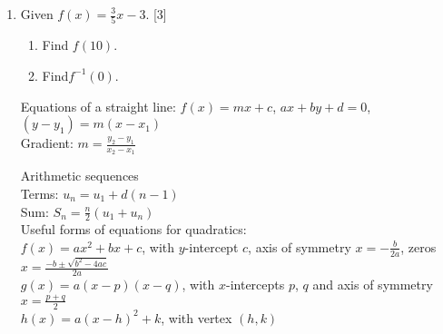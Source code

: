 \documentclass[12pt, twoside]{article}
\begin{document}
\begin{enumerate}
\item Given $f(x)=\frac{3}{5}x-3$.  \hfill [3]
\begin{enumerate}
    \item Find $f(10)$. \vspace{2cm}
    \item Find$f^{-1}(0)$.
\end{enumerate}

\newpage
Equations of a straight line: $f(x)=mx+c$, $ax+by+d=0$, $(y-y_1)=m(x-x_1)$\\[0.25cm]
Gradient: $\displaystyle m=\frac{y_2-y_1}{x_2-x_1}$ \vspace{1cm}

Arithmetic sequences\\[0.25cm]
Terms: $u_n=u_1 + d(n-1)$\\[0.25cm]
Sum: $\displaystyle S_n= \frac{n}{2}(u_1 + u_n)$\\[0.25cm]

Useful forms of equations for quadratics:\\[0.25cm] 
$f(x)=ax^2 + bx+c$, with $y$-intercept $c$, axis of symmetry $\displaystyle x=-\frac{b}{2a}$, zeros $\displaystyle x=\frac{-b \pm \sqrt{b^2-4ac}}{2a}$\\[0.25cm]
$g(x)=a(x-p)(x-q)$, with $x$-intercepts $p$, $q$ and axis of symmetry $\displaystyle x=\frac{p+q}{2}$\\[0.25cm] 
$h(x)=a(x-h)^2+k$, with vertex $(h,k)$


\end{enumerate}
\end{document}
